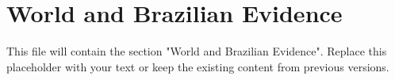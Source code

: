 \section{World and Brazilian Evidence}


This file will contain the section "World and Brazilian Evidence". Replace this placeholder with your text or keep the existing content from previous versions.